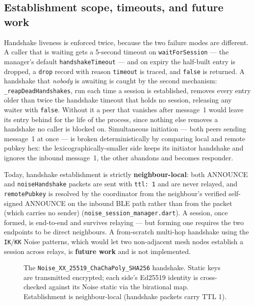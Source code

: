 \documentclass[11pt]{report}
\newcommand{\code}[1]{\texttt{\small #1}}
\begin{document}
\subsection*{Establishment scope, timeouts, and future work}

Handshake liveness is enforced twice, because the two failure modes are different. A caller that is waiting gets a 5-second timeout on \code{waitForSession} --- the manager's default \code{handshakeTimeout} --- and on expiry the half-built entry is dropped, a \code{drop} record with reason \code{timeout} is traced, and \code{false} is returned. A handshake that \emph{nobody} is awaiting is caught by the second mechanism: \code{\_reapDeadHandshakes}, run each time a session is established, removes every entry older than twice the handshake timeout that holds no session, releasing any waiter with \code{false}. Without it a peer that vanishes after message~1 would leave its entry behind for the life of the process, since nothing else removes a handshake no caller is blocked on. Simultaneous initiation --- both peers sending message~1 at once --- is broken deterministically by comparing local and remote pubkey hex: the lexicographically-smaller side keeps its initiator handshake and ignores the inbound message~1, the other abandons and becomes responder.

Today, handshake establishment is strictly \textbf{neighbour-local}: both ANNOUNCE and \code{noiseHandshake} packets are sent with \code{ttl: 1} and are never relayed, and \code{remotePubkey} is resolved by the coordinator from the neighbour's verified self-signed ANNOUNCE on the inbound BLE path rather than from the packet (which carries no sender) (\code{noise\_session\_manager.dart}). A session, once formed, is end-to-end and survives relaying --- but forming one requires the two endpoints to be direct neighbours. A from-scratch multi-hop handshake using the \code{IK}/\code{KK} Noise patterns, which would let two non-adjacent mesh nodes establish a session across relays, is \textbf{future work} and is not implemented.


\begin{figure}[htbp]\centering
{}
\caption{The \code{Noise\_XX\_25519\_ChaChaPoly\_SHA256} handshake. Static keys are transmitted encrypted; each side's Ed25519 identity is cross-checked against its Noise static via the birational map. Establishment is neighbour-local (handshake packets carry TTL 1).}
\label{fig:handshake}
\end{figure}
\end{document}
